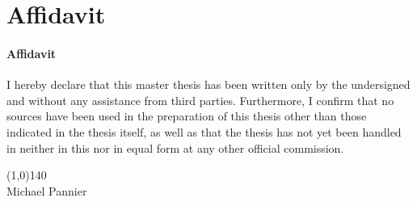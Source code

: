 \chapter*{Affidavit}

\subsubsection{Affidavit}
I hereby declare that this master thesis has been written only by the undersigned and without any assistance from third parties.
Furthermore, I confirm that no sources have been used in the preparation of this thesis other than those indicated in the thesis itself, as well
as that the thesis has not yet been handled in neither in this nor in equal form  at any other official commission.

\vspace{1.5cm}
\line(1,0){140}\\
Michael Pannier
